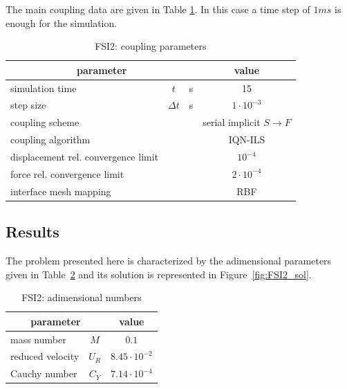The main coupling data are given in Table \ref{table:FSI2-coupling}. In this case a time step of $1ms$ is enough for the simulation.

\begin{table}[!htb]
	\begin{center}
		\begin{tabular}{ l c  l| c } 
			\multicolumn{3}{c|}{parameter} & value   \\ 
			\hline
			simulation time  & $t$& \si{s} & 15      \\
			step size & $\Delta t$ & \si{s} & $1 \cdot 10^{-3}$   \\
			\hline
			coupling scheme & & & serial implicit  $S\rightarrow F$  \\
			coupling algorithm & & &  IQN-ILS  \\
			displacement rel. convergence limit & & & $10^{-4}$ \\
			force rel. convergence limit &&  & $2 \cdot 10^{-4}$  \\
      		interface mesh mapping & & & RBF  \\
			
		\end{tabular}
	\end{center}
	\caption{FSI2: coupling parameters}
	\label{table:FSI2-coupling}
\end{table}


\subsection{Results}

The problem presented here is characterized by the adimensional parameters given in Table~\ref{table:FSI2-adim} and its solution is represented in Figure~\ref{fig:FSI2_sol}.

\begin{table}[!htb]
	\begin{center}
		\begin{tabular}{ l c | c } 
			\multicolumn{2}{c|}{parameter} & value   \\ 
			\hline
			mass number  & $M$ & $0.1$     \\
			reduced velocity & $U_R$ & $ 8.45\cdot 10^{-2}$  \\
			Cauchy number  & $C_Y$ & $  7.14 \cdot 10^{-4}$  \\			
		\end{tabular}
	\end{center}
	\caption{FSI2: adimensional numbers}
	\label{table:FSI2-adim}
\end{table}


